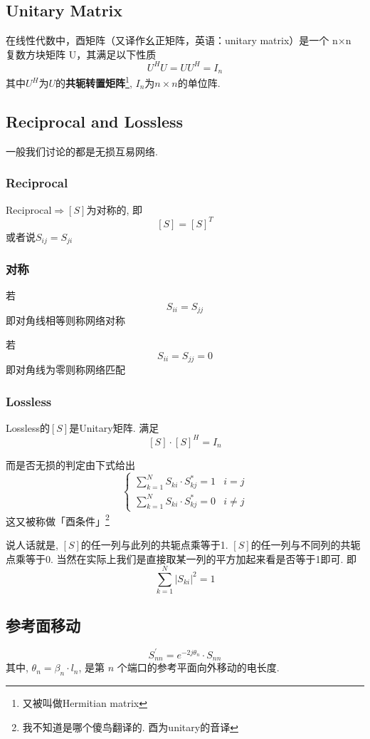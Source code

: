 \documentclass[a4paper]{report}
\begin{document}
\subsection{Unitary Matrix}
在线性代数中，酉矩阵（又译作幺正矩阵，英语：unitary matrix）是一个 n×n 复数方块矩阵 U，其满足以下性质
$$U^H U=U U^H=I_n$$
其中$U^H$为$U$的\textbf{共轭转置矩阵}\footnote{又被叫做Hermitian matrix}, $I_n$为$n\times n$的单位阵. 
\subsection{Reciprocal and Lossless}
一般我们讨论的都是无损互易网络. 
\subsubsection{Reciprocal}
Reciprocal$\Rightarrow [S]$为对称的, 即
$$[S]=[S]^T$$或者说$S_{ij}=S_{ji}$
\subsubsection{对称}
若
$$S_{ii}=S_{jj}$$
即对角线相等则称网络对称

若$$S_{ii}=S_{jj}=0$$
即对角线为零则称网络匹配
\subsubsection{Lossless}
Lossless的$[S]$是Unitary矩阵. 满足
$$[S]\cdot [S]^H=I_n$$

而是否无损的判定由下式给出
\begin{equation}
  \begin{cases}
    \displaystyle\sum_{k=1}^{N}S_{ki}\cdot S^*_{kj}=1& i=j
    \\ \displaystyle\sum_{k=1}^{N}S_{ki}\cdot S^*_{kj}=0 &i\neq j
  \end{cases}
  \label{eq:unitary}
\end{equation}
这又被称做「酉条件」\footnote{我不知道是哪个傻鸟翻译的. 酉为unitary的音译}

说人话就是, $[S]$的任一列与此列的共轭点乘等于1. $[S]$的任一列与不同列的共轭点乘等于0. 
当然在实际上我们是直接取某一列的平方加起来看是否等于1即可. 即
$$\displaystyle\sum_{k=1}^{N}\lvert S_{ki}\rvert^2=1$$
\subsection{参考面移动}
$$S^\prime_{nn}=e^{-2j\theta_n}\cdot S_{nn}$$
其中, $\theta_n=\beta_n\cdot l_n$, 是第 $n$ 个端口的参考平面向外移动的电长度. 
\end{document}
